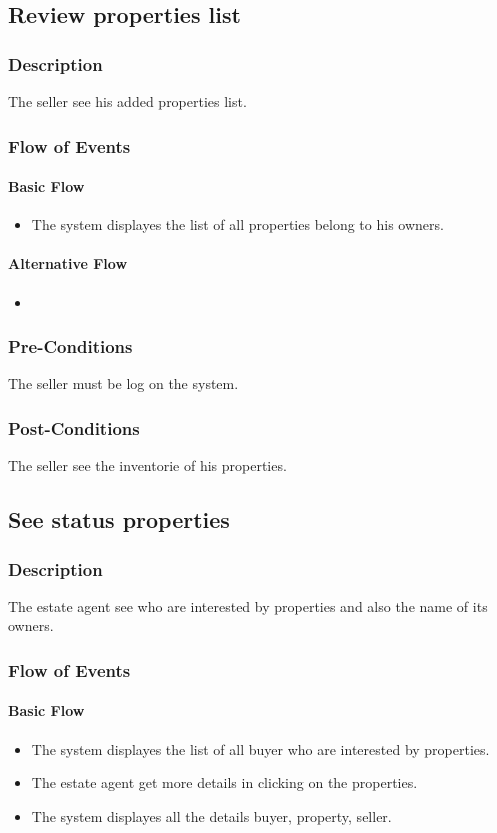 \documentclass[a4paper,12pt]{article}
\begin{document}
\subsection{Review properties list}
\subsubsection{Description}
The seller see his added properties list.
\subsubsection{Flow of Events}
\paragraph{Basic Flow}
\begin{itemize}
\item The system displayes the list of all properties belong to his owners.
\end{itemize}
\paragraph{Alternative Flow}
\begin{itemize}
\item
\end{itemize}
\subsubsection{Pre-Conditions}
The seller must be log on the system.
\subsubsection{Post-Conditions}
The seller see the inventorie of his properties.

\subsection{See status properties}
\subsubsection{Description}
The estate agent see who are interested by properties and also the name of its owners.
\subsubsection{Flow of Events}
\paragraph{Basic Flow}
\begin{itemize}
\item The system displayes the list of all buyer who are interested by properties.
\item The estate agent get more details in clicking on the properties.
\item The system displayes all the details buyer, property, seller.
\end{itemize}
\end{document}
